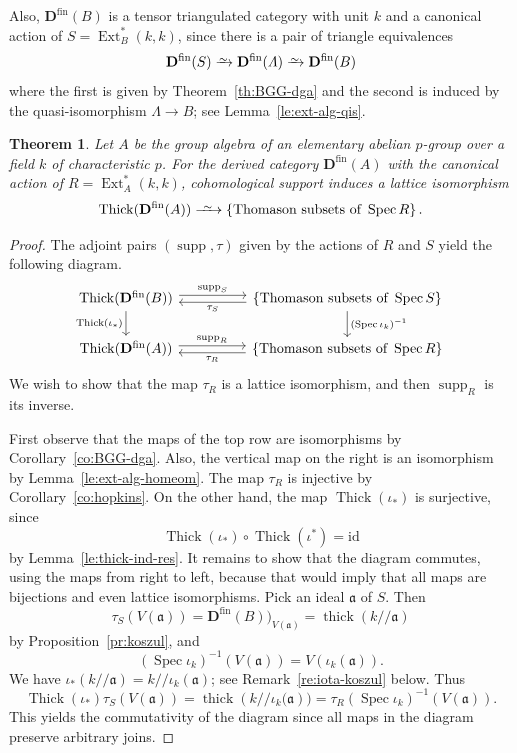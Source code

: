 \documentclass{amsart}[a4]
\newtheorem{theorem}{Theorem}[section]
\theoremstyle{definition}
\theoremstyle{remark}
\numberwithin{equation}{section}
\newcommand{\Ext}{\operatorname{Ext}}
\newcommand{\Spec}{\operatorname{Spec}}
\newcommand{\supp}{\operatorname{supp}}
\newcommand{\thick}{\operatorname{thick}}
\newcommand{\Thick}{\operatorname{Thick}}
\newcommand{\iso}{\xrightarrow{\raisebox{-.6ex}[0ex][0ex]{$\scriptstyle{\sim}$}}}
\newcommand{\kos}[2]{{#1}/\!\!/{#2}}
\newcommand{\longiso}{\xrightarrow{\
    \raisebox{-.6ex}[0ex][0ex]{$\scriptstyle{\sim}$}\ }}
\newcommand{\fin}{\mathrm{fin}}
\newcommand{\id}{\mathrm{id}}
\newcommand{\bfD}{\mathbf D}
\newcommand{\fa}{\mathfrak{a}}
\let\Lambda\varLambda
\begin{document}
Also, $\bfD^\fin(B)$ is a tensor triangulated category with unit $k$
and a canonical action of $S=\Ext_{B}^*(k,k)$, since there is a pair
of triangle equivalences
\[\bfD^\fin(S)\iso\bfD^\fin(\Lambda)\iso \bfD^\fin(B)\] where the first
is given by Theorem~\ref{th:BGG-dga} and the second is induced by the
quasi-isomorphism $\Lambda\to B$; see Lemma~\ref{le:ext-alg-qis}.


\begin{theorem}\label{th:hopkins-elem-ab}
  Let $A$ be the group algebra of an elementary abelian $p$-group over
  a field $k$ of characteristic $p$.  For the derived category
  $\bfD^\fin(A)$ with the canonical action of $R=\Ext_{A}^*(k,k)$,
  cohomological support induces a lattice isomorphism
  \begin{equation*}
    \Thick(\bfD^\fin(A))\longiso\{\text{Thomason subsets of }\Spec
    R\}\,.
\end{equation*}  
\end{theorem}
\begin{proof}
The adjoint pairs $(\supp,\tau)$  given by the actions of $R$ and $S$ yield the following diagram.
\begin{equation*}
  \begin{tikzcd}
    \Thick(\bfD^\fin(B)) \ar[rr,
    yshift=2.5,"\supp_S"]\ar[d,swap,"\Thick(\iota_*)"] &&\ar[ll,
    yshift=-2.5,"\tau_S"]
    \{\text{Thomason subsets of }\Spec S\}\ar[d,"(\Spec \iota_k)^{-1}"]\\
    \Thick(\bfD^\fin(A)) \ar[rr, yshift=2.5,"\supp_R"] && \ar[ll,
    yshift=-2.5,"\tau_R"]\{\text{Thomason subsets of }\Spec R\}
\end{tikzcd}
\end{equation*}
We wish to show that the map $\tau_R$ is a lattice isomorphism, and
then $\supp_R$ is its inverse.

First observe that the maps of the top row are isomorphisms by
Corollary~\ref{co:BGG-dga}. Also, the vertical map on the right is an
isomorphism by Lemma~\ref{le:ext-alg-homeom}. The map $\tau_R$ is
injective by Corollary~\ref{co:hopkins}. On the other hand, the map
$\Thick(\iota_*)$ is surjective, since
\[\Thick(\iota_*)\circ \Thick(\iota^*)=\id\] by
Lemma~\ref{le:thick-ind-res}.  It remains to show that the diagram
commutes, using the maps from right to left, because that would imply
that all maps are bijections and even lattice isomorphisms. Pick an ideal $\fa$ of
$S$. Then
\[\tau_S(V(\fa))=\bfD^\fin(B))_{V(\fa)}=\thick(\kos{k}{\fa})\] 
by Proposition~\ref{pr:koszul},
and \[(\Spec \iota_k)^{-1}(V(\fa))=V(\iota_k(\fa)).\] We have
$\iota_*(\kos{k}{\fa})=\kos{k}{\iota_k(\fa)}$; see
Remark~\ref{re:iota-koszul} below. Thus
\[\Thick(\iota_*)\tau_S(V(\fa))=\thick(\kos{k}{\iota_k(\fa}))=\tau_R(\Spec \iota_k)^{-1}(V(\fa)).\]
This yields the commutativity of the diagram since all maps in the diagram preserve
arbitrary joins.
\end{proof}
\end{document}
